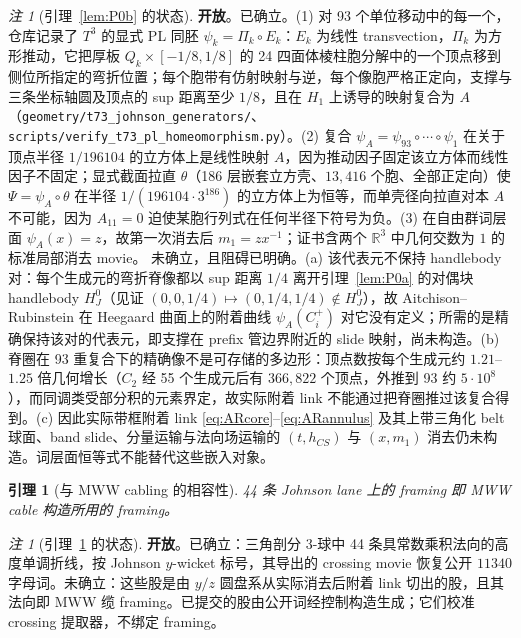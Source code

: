 \documentclass[11pt]{amsart}
\newtheorem{lemma}[theorem]{引理}
\theoremstyle{definition}
\theoremstyle{remark}
\newtheorem{remark}[theorem]{注}
\newcommand{\Open}{\textbf{开放}}
\begin{document}
\begin{remark}[引理~\ref{lem:P0b} 的状态]
\Open。已确立。(1) 对 93 个单位移动中的每一个，仓库记录了 $T^3$ 的显式 PL 同胚 $\psi_k=\Pi_k\circ E_k$：$E_k$ 为线性 transvection，$\Pi_k$ 为方形推动，它把厚板 $Q_k\times[-1/8,1/8]$ 的 24 四面体棱柱胞分解中的一个顶点移到侧位所指定的弯折位置；每个胞带有仿射映射与逆，每个像胞严格正定向，支撑与三条坐标轴圆及顶点的 sup 距离至少 $1/8$，且在 $H_1$ 上诱导的映射复合为 $A$（\texttt{geometry/t73\_johnson\_generators/}、\texttt{scripts/verify\_t73\_pl\_homeomorphism.py}）。(2) 复合 $\psi_A=\psi_{93}\circ\cdots\circ\psi_1$ 在关于顶点半径 $1/196104$ 的立方体上是线性映射 $A$，因为推动因子固定该立方体而线性因子不固定；显式截面拉直 $\theta$（186 层嵌套立方壳、$13{,}416$ 个胞、全部正定向）使 $\Psi=\psi_A\circ\theta$ 在半径 $1/(196104\cdot3^{186})$ 的立方体上为恒等，而单壳径向拉直对本 $A$ 不可能，因为 $A_{11}=0$ 迫使某胞行列式在任何半径下符号为负。(3) 在自由群词层面 $\psi_A(x)=z$，故第一次消去后 $m_1=zx^{-1}$；证书含两个 $\mathbb R^3$ 中几何交数为 $1$ 的标准局部消去 movie。
未确立，且阻碍已明确。(a) 该代表元不保持 handlebody 对：每个生成元的弯折脊像都以 sup 距离 $1/4$ 离开引理~\ref{lem:P0a} 的对偶块 handlebody $H_J^0$（见证 $(0,0,1/4)\mapsto(0,1/4,1/4)\notin H_J^0$），故 Aitchison--Rubinstein 在 Heegaard 曲面上的附着曲线 $\psi_A(C_i^+)$ 对它没有定义；所需的是精确保持该对的代表元，即支撑在 prefix 管边界附近的 slide 映射，尚未构造。(b) 脊圈在 93 重复合下的精确像不是可存储的多边形：顶点数按每个生成元约 $1.21$--$1.25$ 倍几何增长（$C_2$ 经 55 个生成元后有 $366{,}822$ 个顶点，外推到 93 约 $5\cdot10^8$），而同调类受部分积的元素界定，故实际附着 link 不能通过把脊圈推过该复合得到。(c) 因此实际带框附着 link \eqref{eq:ARcore}--\eqref{eq:ARannulus} 及其上带三角化 belt 球面、band slide、分量运输与法向场运输的 $(t,h_{CS})$ 与 $(x,m_1)$ 消去仍未构造。词层面恒等式不能替代这些嵌入对象。
\end{remark}

\begin{lemma}[与 MWW cabling 的相容性]\label{lem:P0c}
44 条 Johnson lane 上的 framing 即 MWW cable
构造所用的 framing。
\end{lemma}

\begin{remark}[引理~\ref{lem:P0c} 的状态]
\Open。已确立：三角剖分 $3$-球中 44 条具常数乘积法向的高度单调折线，按 Johnson $y$-wicket 标号，其导出的 crossing movie 恢复公开 $11340$ 字母词。未确立：这些股是由 $y/z$ 圆盘系从实际消去后附着 link 切出的股，且其法向即 MWW 缆 framing。已提交的股由公开词经控制构造生成；它们校准 crossing 提取器，不绑定 framing。
\end{remark}
\end{document}
